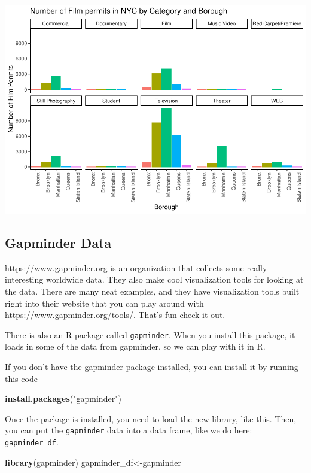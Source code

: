 \documentclass[]{book}
\newenvironment{Shaded}{\begin{snugshade}}{\end{snugshade}}
\newcommand{\KeywordTok}[1]{\textcolor[rgb]{0.13,0.29,0.53}{\textbf{#1}}}
\newcommand{\StringTok}[1]{\textcolor[rgb]{0.31,0.60,0.02}{#1}}
\newcommand{\NormalTok}[1]{#1}
\begin{document}
\includegraphics{Statistics_Lab_files/figure-latex/1facetwrap2-1.pdf}

\subsection{Gapminder Data}\label{gapminder-data}

\url{https://www.gapminder.org} is an organization that collects some
really interesting worldwide data. They also make cool visualization
tools for looking at the data. There are many neat examples, and they
have visualization tools built right into their website that you can
play around with \url{https://www.gapminder.org/tools/}. That's fun
check it out.

There is also an R package called \texttt{gapminder}. When you install
this package, it loads in some of the data from gapminder, so we can
play with it in R.

If you don't have the gapminder package installed, you can install it by
running this code

\begin{Shaded}
\begin{Highlighting}[]
\KeywordTok{install.packages}\NormalTok{(}\StringTok{"gapminder"}\NormalTok{)}
\end{Highlighting}
\end{Shaded}

Once the package is installed, you need to load the new library, like
this. Then, you can put the \texttt{gapminder} data into a data frame,
like we do here: \texttt{gapminder\_df}.

\begin{Shaded}
\begin{Highlighting}[]
\KeywordTok{library}\NormalTok{(gapminder)}
\NormalTok{gapminder_df<-gapminder}
\end{Highlighting}
\end{Shaded}
\end{document}
